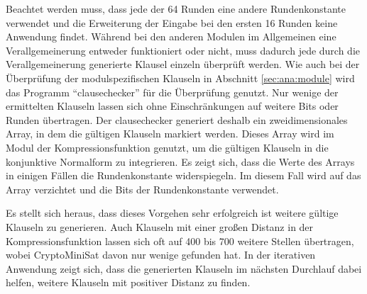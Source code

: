 Beachtet werden muss, dass jede der 64 Runden eine andere Rundenkonstante verwendet und die Erweiterung der Eingabe bei den ersten 16 Runden keine
Anwendung findet. Während bei den anderen Modulen im Allgemeinen eine Verallgemeinerung entweder funktioniert oder nicht, muss dadurch jede durch die
Verallgemeinerung generierte Klausel einzeln überprüft werden. Wie auch bei der Überprüfung der modulspezifischen Klauseln in Abschnitt \ref{sec:ana:module}
wird das Programm "`clausechecker"' für die Überprüfung genutzt. Nur wenige der ermittelten Klauseln lassen sich ohne Einschränkungen auf weitere Bits oder
Runden übertragen. Der clausechecker generiert deshalb ein zweidimensionales Array, in dem die gültigen Klauseln markiert werden. Dieses Array wird im
Modul der Kompressionsfunktion genutzt, um die gültigen Klauseln in die konjunktive Normalform zu integrieren. Es zeigt sich, dass die Werte des Arrays in
einigen Fällen die Rundenkonstante widerspiegeln. Im diesem Fall wird auf das Array verzichtet und die Bits der Rundenkonstante verwendet.

Es stellt sich heraus, dass dieses Vorgehen sehr erfolgreich ist weitere gültige Klauseln zu generieren. Auch Klauseln mit einer großen Distanz in der Kompressionsfunktion
lassen sich oft auf 400 bis 700 weitere Stellen übertragen, wobei CryptoMiniSat davon nur wenige gefunden hat. In der iterativen Anwendung zeigt sich, dass die
generierten Klauseln im nächsten Durchlauf dabei helfen, weitere Klauseln mit positiver Distanz zu finden.